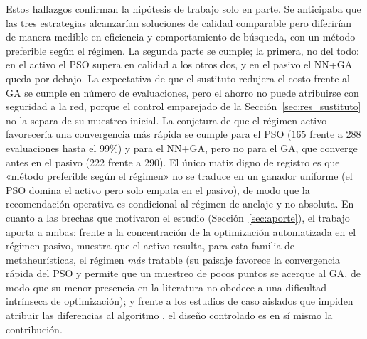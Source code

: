 Estos hallazgos confirman la hipótesis de trabajo solo en parte. Se anticipaba que las
tres estrategias alcanzarían soluciones de calidad comparable pero diferirían de manera
medible en eficiencia y comportamiento de búsqueda, con un método preferible según el
régimen. La segunda parte se cumple; la primera, no del todo: en el activo el PSO supera
en calidad a los otros dos, y en el pasivo el NN+GA queda por debajo. La expectativa de
que el sustituto redujera el costo frente al GA se cumple en número de evaluaciones,
pero el ahorro no puede atribuirse con seguridad a la red, porque el control emparejado
de la Sección~\ref{sec:res_sustituto} no la separa de su muestreo inicial. La conjetura de
que el régimen activo favorecería una convergencia más rápida se cumple para el PSO
($165$ frente a $288$ evaluaciones hasta el $99\%$) y para el NN+GA, pero no para el GA,
que converge antes en el pasivo ($222$ frente a $290$). El único matiz digno de registro es que «método preferible según
el régimen» no se traduce en un ganador uniforme (el PSO domina el activo pero solo
empata en el pasivo), de modo que la recomendación operativa es condicional al régimen de
anclaje y no absoluta. En cuanto a las brechas que motivaron el estudio
(Sección~\ref{sec:aporte}), el trabajo aporta a ambas: frente a la concentración de la
optimización automatizada en el régimen pasivo, muestra que el activo resulta, para esta
familia de metaheurísticas, el régimen \emph{más} tratable (su paisaje favorece la convergencia
rápida del PSO y permite que un muestreo de pocos puntos se acerque al GA, de modo que su
menor presencia en la literatura no obedece a una dificultad intrínseca de optimización); y
frente a los estudios de caso aislados que impiden atribuir las diferencias al algoritmo
\cite{Genty2021,Jiang2022}, el diseño controlado es en sí mismo la contribución.

